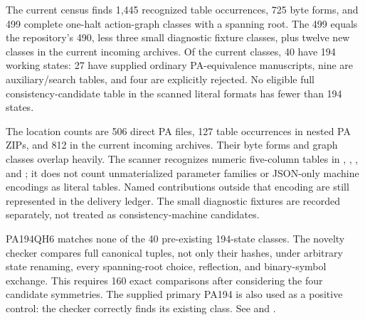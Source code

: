 The current census finds 1,445 recognized table occurrences, 725 byte
forms, and 499 complete one-halt action-graph classes with a spanning root.
The 499 equals the repository's 490, less three small diagnostic fixture
classes, plus twelve new classes in the current incoming archives.
Of the current classes, 40 have 194 working states: 27 have supplied
ordinary PA-equivalence manuscripts, nine are auxiliary/search tables,
and four are explicitly rejected. No eligible full consistency-candidate
table in the scanned literal formats has fewer than 194 states.

The location counts are 506 direct PA files, 127 table occurrences in
nested PA ZIPs, and 812 in the current incoming archives. Their byte forms
and graph classes overlap heavily. The scanner recognizes numeric
five-column tables in , , , and ;
it does not count unmaterialized parameter families or JSON-only machine
encodings as literal tables. Named contributions outside that encoding are
still represented in the delivery ledger. The small diagnostic fixtures
are recorded separately, not treated as consistency-machine candidates.

PA194QH6 matches none of the 40 pre-existing 194-state classes. The
novelty checker compares full canonical tuples, not only their hashes,
under arbitrary state renaming, every spanning-root choice, reflection,
and binary-symbol exchange. This requires 160 exact comparisons after
considering the four candidate symmetries. The supplied primary PA194 is
also used as a positive control: the checker correctly finds its existing
class. See  and
.
